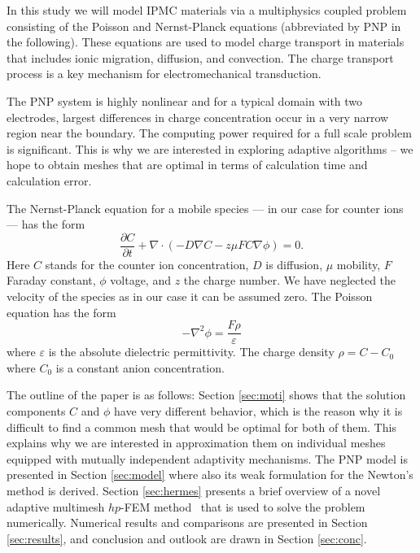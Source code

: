 In this study we will model IPMC materials via a multiphysics coupled problem 
consisting of the Poisson and Nernst-Planck equations (abbreviated by PNP in
the following). These equations are used to model charge transport in materials 
that includes ionic migration, diffusion, and convection. The charge transport 
process is a key mechanism for electromechanical transduction.

The PNP system is highly nonlinear and for a typical domain with two
electrodes, largest differences in charge concentration occur in a very narrow
region near the boundary. The computing power required for a full scale problem 
is significant. This is why we are interested in exploring adaptive algorithms
-- we hope to obtain meshes that are optimal in terms of calculation time and 
calculation error.

The Nernst-Planck equation for a mobile species ---
in our case for counter ions --- has the form
\begin{equation}
  \frac{\partial C}{\partial t}+\nabla\cdot(-D\nabla C-z\mu FC\nabla\phi)=0.
  \label{eq:nernst-planck}
\end{equation}
Here $C$ stands for the counter ion concentration, $D$ is diffusion, $\mu$ mobility,
$F$ Faraday constant, $\phi$ voltage, and $z$ the charge number. We have neglected 
the velocity of the species as in our case it can be assumed zero. 
The Poisson equation has the form
\begin{equation}
  -\nabla^2\phi=\frac{F\rho}{\varepsilon}
  \label{eq:poisson}
\end{equation}
where $\varepsilon$ is the absolute dielectric permittivity. The
charge density $\rho = C-C_{0}$ 
where $C_{0}$ is a constant anion concentration.

The outline of the paper is as follows: Section \ref{sec:moti} shows that 
the solution components $C$ and $\phi$ have very different behavior, which
is the reason why it is difficult to find a common mesh that would be optimal 
for both of them. This explains why we are interested in approximation them
on individual meshes equipped with mutually independent adaptivity 
mechanisms. The PNP model is presented in Section \ref{sec:model} where also its weak 
formulation for the Newton's method is derived. Section \ref{sec:hermes}
presents a brief overview of a novel adaptive multimesh $hp$-FEM 
method~\cite{solin2010monolithic,solin2010adaptive,dubcova2010space,solini2010adaptive}
that is used to solve the 
problem numerically. Numerical results and comparisons are presented in Section 
\ref{sec:results}, and conclusion and outlook are drawn in Section \ref{sec:conc}.


